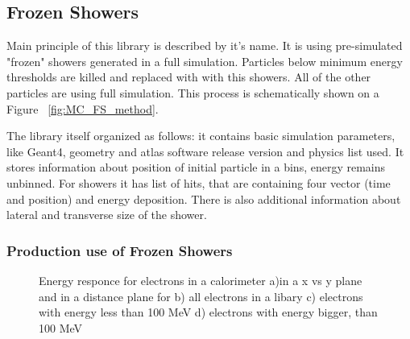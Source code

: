 \subsection{Frozen Showers}
Main principle of this library is described by it's name. It is using pre-simulated "frozen" showers generated in a full simulation. Particles below minimum energy
thresholds are killed and replaced with with this showers. All of the other particles are using full simulation. This process is schematically shown on a Figure ~\ref{fig:MC_FS_method}.
\begin{figure}
\end{figure}
The library itself organized as follows: it contains basic simulation parameters, like Geant4, geometry and atlas software release version and physics list used. It stores information about position of initial particle in a bins, energy remains unbinned. For showers it has list of hits, that are containing four vector (time and position) and energy deposition. There is also additional information about lateral and transverse size of the shower. 

\subsubsection{Production use of Frozen Showers}

\begin{figure}[h]
\begin{minipage}[h]{0.49\linewidth}
\end{minipage}
\hfill
\begin{minipage}[h]{0.49\linewidth}
\end{minipage}
\vfill
\begin{minipage}[h]{0.49\linewidth}
\end{minipage}
\hfill
\begin{minipage}[h]{0.49\linewidth}
\end{minipage}
\caption{Energy responce for electrons in a calorimeter a)in a x vs y plane and  in a distance plane  for b) all electrons in a libary  c) electrons with energy less than 100 MeV d) electrons with energy bigger, than 100 MeV}
\label{fig:Class}
\end{figure}



